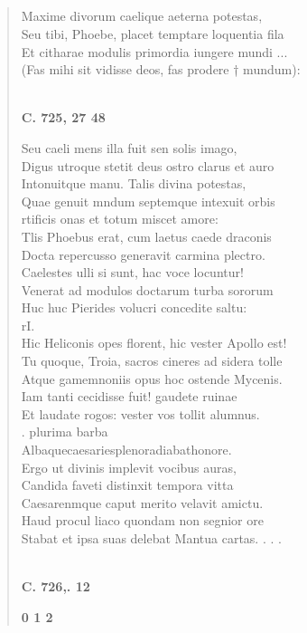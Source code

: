 \documentclass[11pt, a4paper]{report}
\begin{document}
            \subsection*{}
      \begin{verse}
      Maxime divorum caelique aeterna potestas, \\ Seu tibi, Phoebe, placet temptare loquentia fila \\ Et citharae modulis primordia iungere mundi ... \\ (Fas mihi sit vidisse deos, fas prodere † mundum): \\ 
        ﻿\pagebreak 
     \marginpar{[212]} \begin{center} \textbf{C. 725, 27 48} \end{center}Seu caeli mens illa fuit sen solis imago, \\ Digus utroque stetit  \lbrack deus \rbrack  ostro clarus et auro \\ Intonuitque manu. Talis divina potestas, \\ Quae genuit mndum septemque intexuit orbis \\ rtificis onas et totum miscet amore: \\ Tlis Phoebus erat, cum laetus caede draconis \\ Docta repercusso generavit carmina plectro. \\ Caelestes ulli si sunt, hac voce locuntur! \\ Venerat ad modulos doctarum turba sororum \\ Huc huc Pierides volucri concedite saltu: \\ rI. \\ Hic Heliconis opes florent, hic vester Apollo est! \\ Tu quoque, Troia, sacros cineres ad sidera tolle \\ Atque gamemnoniis opus hoc ostende Mycenis. \\ Iam tanti cecidisse fuit! gaudete ruinae \\ Et laudate rogos: vester vos tollit alumnus. \\ . plurima barba \\ Albaquecaesariesplenoradiabathonore. \\ Ergo ut divinis implevit vocibus auras, \\ Candida faveti distinxit tempora vitta \\ Caesarenmque caput merito velavit amictu. \\ Haud procul liaco quondam non segnior ore \\ Stabat et ipsa suas delebat Mantua cartas. . . . \\ 
        ﻿\pagebreak 
    \begin{center} \textbf{C. 726,. 12} \end{center}\begin{center} \textbf{0 1 2} \end{center}
      \end{verse}
  
\end{document}
